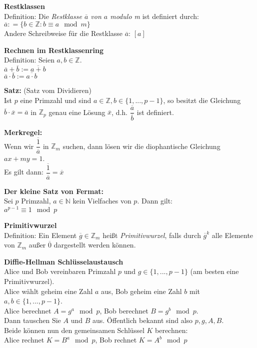 \documentclass[a4paper]{article}
\newcommand{\Mod}[3]{#1\equiv#2\mod#3}
\begin{document}
\textbf{Restklassen} \\
Definition: Die \textit{Restklasse $\overline{a}$ von $a$ modulo m} ist definiert durch: \\
$\overline{a}: = \{b \in \mathbb{Z}: \Mod{b}{a}{m} \}$ \\
Andere Schreibweise für die Restklasse $\overline{a}$: $[a]$
\bigskip

\textbf{Rechnen im Restklassenring} \\
Definition: Seien $a, b \in \mathbb{Z}$. \\
$\overline{a} + \overline{b} := \overline{a+b}$ \\
$\overline{a} \cdot \overline{b} := \overline{a \cdot b}$ 
\bigskip

\textbf{Satz:} (Satz vom Dividieren) \\
Ist $p$ eine Primzahl und sind $a \in \mathbb{Z}, b \in \{1,...,p-1\}$, so besitzt die Gleichung \\
$\overline{b} \cdot \overline{x} = \overline{a}$ in $\mathbb{Z}_p$ genau eine Lösung $\overline{x}$,
d.h. $\dfrac{\overline{a}}{\overline{b}}$ ist definiert.
\bigskip

\textbf{Merkregel:} \\
Wenn wir $\dfrac{\overline{1}}{\overline{a}}$ in $\mathbb{Z}_m$ suchen, dann lösen
wir die diophantische Gleichung $ax+my = 1$. \\
Es gilt dann: $\dfrac{\overline{1}}{\overline{a}} = \overline{x}$
\bigskip

\textbf{Der kleine Satz von Fermat:} \\
Sei $p$ Primzahl, $a \in \mathbb{N}$ kein Vielfaches von $p$. Dann gilt: \\
$\Mod{a^{p-1}}{1}{p}$
\bigskip

\textbf{Primitivwurzel} \\
Definition: Ein Element $\overline{g} \in \mathbb{Z}_m$ heißt \textit{Primitivwurzel}, falls durch
$\overline{g}^k$ alle Elemente von $\mathbb{Z}_m$ außer $\overline{0}$ dargestellt werden können.
\bigskip

\textbf{Diffie-Hellman Schlüsselaustausch} \\
Alice und Bob vereinbaren Primzahl $p$ und $g \in \{1,...,p-1\}$ (am besten eine Primitivwurzel). \\
Alice wählt geheim eine Zahl $a$ aus, Bob geheim eine Zahl $b$ mit $a,b \in \{1,...,p-1\}$. \\
Alice berechnet $A = g^a \mod p$, Bob berechnet $B = g^b \mod p$. \\
Dann tauschen Sie $A$ und $B$ aus. Öffentlich bekannt sind also $p, g, A, B$. \\
Beide können nun den gemeinsamen Schlüssel $K$ berechnen: \\
Alice rechnet $K = B^a \mod p$, Bob rechnet $K = A^b \mod p$
\bigskip
\end{document}
